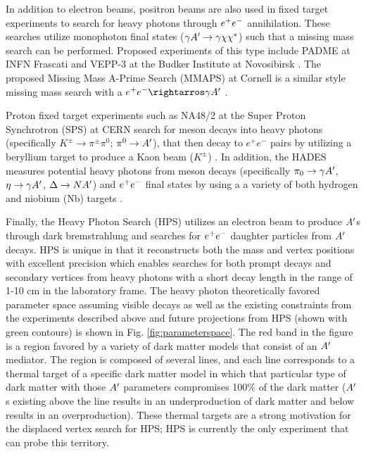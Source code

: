 In addition to electron beams, positron beams are also used in fixed target experiments to search for heavy photons through $e^{+}e^{-}$ annihilation. These searches utilize monophoton final states ($\gamma A^\prime \rightarrow \gamma \chi \chi^*$) such that a missing mass search can be performed. Proposed experiments of this type include PADME at INFN Frascati and VEPP-3 at the Budker Institute at Novosibirsk \cite{Wojtsekhowski:2012zq}. The proposed Missing Mass A-Prime Search (MMAPS) at Cornell is a similar style missing mass search with a $\epem \rightarros \gamma \aprime$ \cite{Alexander2016}.

Proton fixed target experiments such as NA48/2 at the Super Proton Synchrotron (SPS) at CERN search for meson decays into heavy photons (specifically $K^{\pm} \rightarrow \pi^{\pm} \pi^0$; $\pi^0 \rightarrow A^\prime$), that then decay to $e^+e^-$ pairs by utilizing a beryllium target to produce a Kaon beam ($K^{\pm}$) \cite{Batley:2015lha}. In addition, the HADES measures potential heavy photons from meson decays (specifically $\pi_0 \rightarrow \gamma A^\prime$, $\eta \rightarrow \gamma A^\prime$, $\Delta \rightarrow N A^\prime$) and $e^{+}e^{-}$ final states by using a a variety of both hydrogen and niobium (Nb) targets \cite{Agakishiev:2013fwl}.

Finally, the Heavy Photon Search (HPS) utilizes an electron beam to produce $A^\prime$s through dark bremstrahlung and searches for $e^{+}e^{-}$ daughter particles from $A^\prime$ decays. HPS is unique in that it reconstructs both the mass and vertex positions with excellent precision which enables searches for both prompt decays and secondary vertices from heavy photons with a short decay length in the range of 1-10 cm in the laboratory frame. The heavy photon theoretically favored parameter space assuming visible decays as well as the existing constraints from the experiments described above and future projections from HPS (shown with green contours) is shown in Fig. \ref{fig:parameterspace}. The red band in the figure is a region favored by a variety of dark matter models that consist of an $A^\prime$ mediator. The region is composed of several lines, and each line corresponds to a thermal target of a specific dark matter model in which that particular type of dark matter with those $A^\prime$ parameters compromises 100\% of the dark matter ($A^\prime$s existing above the line results in an underproduction of dark matter and below results in an overproduction). These thermal targets are a strong motivation for the displaced vertex search for HPS; HPS is currently the only experiment that can probe this territory.

